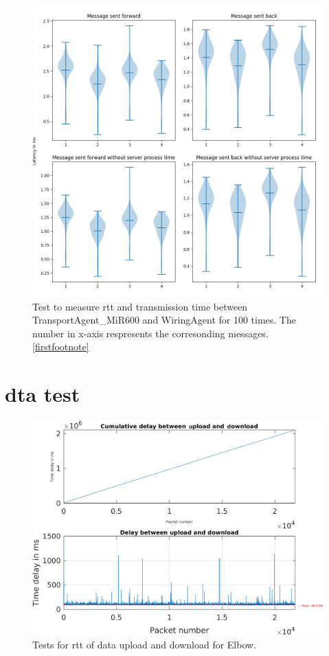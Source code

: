 \begin{figure}[htb]
    \includegraphics[width=\textwidth]{figures/appendix/usecase/violin_TransportAgent_MiR600_to_WiringAgent.png}
    \centering
    \caption{Test to measure \gls{rtt} and transmission time between TransportAgent\_MiR600 and 
    WiringAgent for 100 times. The number in x-axis respresents the 
    corresonding messages. \protect\ref{firstfootnote}}
    \label{fig: violin-T600-WI}
\end{figure}





\section{\gls{dta} test}\label{chap: append-DTagent}
\begin{figure}[htb]
    \includegraphics[width=\textwidth]{figures/appendix/DT/Delay_UploadDownloadCycleTime_Elbow.pdf}\hfill 
    \caption{Tests for \gls{rtt} of data upload and download for Elbow.} \label{fig: UD-cycle-Elbow}
\end{figure}

